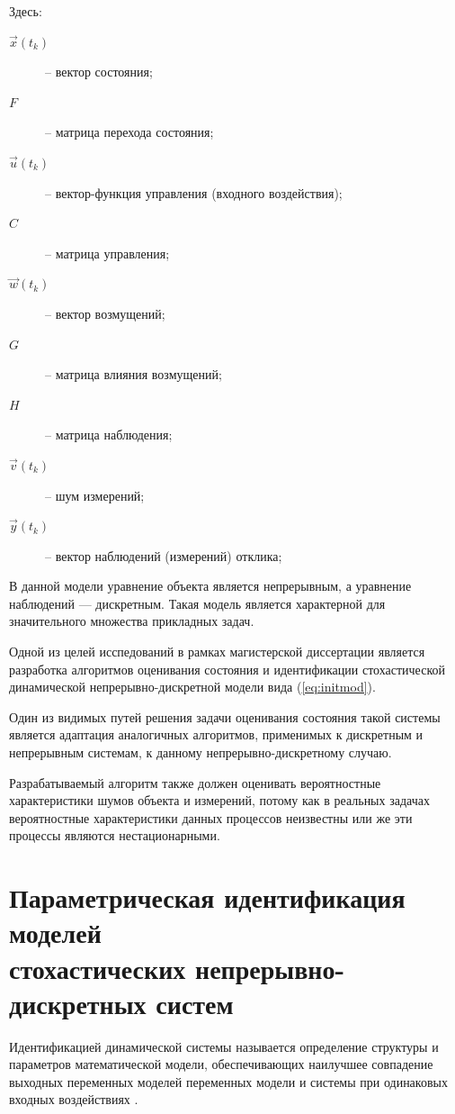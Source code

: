\documentclass[a4paper,14pt]{extarticle}
\let\oldref\ref
\renewcommand{\ref}[1]{(\oldref{#1})}
\begin{document}
Здесь:
\begin{description}
	\item [$\vec{x}(t_k)$] -- вектор состояния;
	\item [$F$] -- матрица перехода состояния;
	\item [$\vec{u}(t_k)$] -- вектор-функция управления (входного воздействия);
	\item [$C$] -- матрица управления;
	\item [$\vec{w}(t_k)$] -- вектор возмущений;
	\item [$G$] -- матрица влияния возмущений;
	\item [$H$] -- матрица наблюдения;
	\item [$\vec{v}(t_k)$] -- шум измерений;
	\item [$\vec{y}(t_k)$] -- вектор наблюдений (измерений) отклика;
\end{description}

В данной модели уравнение объекта является непрерывным, а уравнение наблюдений
--- дискретным. Такая модель является характерной для значительного множества
прикладных задач.

Одной из целей исспедований в рамках магистерской диссертации является
разработка алгоритмов оценивания состояния и идентификации стохастической 
динамической непрерывно-дискретной модели вида \ref{eq:initmod}. 

Один из видимых путей решения задачи оценивания состояния такой системы
является адаптация аналогичных алгоритмов, применимых к дискретным и
непрерывным системам, к данному непрерывно-дискретному случаю.

Разрабатываемый алгоритм также должен оценивать вероятностные характеристики
шумов объекта и измерений, потому как в реальных задачах вероятностные
характеристики данных процессов неизвестны или же эти процессы являются
нестационарными.

\section[Параметрическая идентификация моделей стохастических
\\непрерывно-дискретных систем]
{Параметрическая идентификация моделей \\стохастических
непрерывно-дискретных систем} 

Идентификацией динамической системы называется определение структуры и
параметров математической модели, обеспечивающих наилучшее совпадение выходных
переменных моделей переменных модели и системы при одинаковых входных
воздействиях \cite{chubich}.
\end{document}
